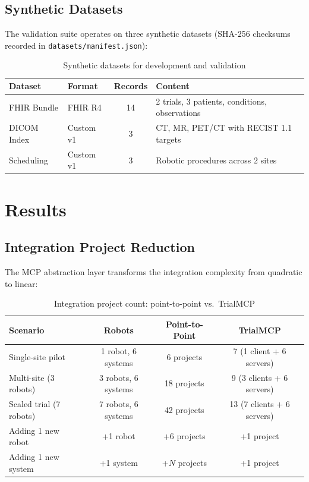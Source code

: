 \documentclass[10pt,letterpaper]{article}
\begin{document}
\subsection{Synthetic Datasets}

The validation suite operates on three synthetic datasets (SHA-256 checksums recorded in \texttt{datasets/manifest.json}):

\begin{table}[H]
\centering
\caption{Synthetic datasets for development and validation}
\label{tab:datasets}
\small
\begin{tabularx}{\textwidth}{l l c X}
\toprule
\textbf{Dataset} & \textbf{Format} & \textbf{Records} & \textbf{Content} \\
\midrule
FHIR Bundle & FHIR R4 & 14 & 2 trials, 3 patients, conditions, observations \\
DICOM Index & Custom v1 & 3 & CT, MR, PET/CT with RECIST 1.1 targets \\
Scheduling & Custom v1 & 3 & Robotic procedures across 2 sites \\
\bottomrule
\end{tabularx}
\end{table}

\section{Results}

\subsection{Integration Project Reduction}

The MCP abstraction layer transforms the integration complexity from quadratic to linear:

\begin{table}[H]
\centering
\caption{Integration project count: point-to-point vs.\ TrialMCP}
\label{tab:integration}
\small
\begin{tabularx}{\textwidth}{l c c c}
\toprule
\textbf{Scenario} & \textbf{Robots} & \textbf{Point-to-Point} & \textbf{TrialMCP} \\
\midrule
Single-site pilot & 1 robot, 6 systems & 6 projects & 7 (1 client + 6 servers) \\
Multi-site (3 robots) & 3 robots, 6 systems & 18 projects & 9 (3 clients + 6 servers) \\
Scaled trial (7 robots) & 7 robots, 6 systems & 42 projects & 13 (7 clients + 6 servers) \\
Adding 1 new robot & +1 robot & +6 projects & +1 project \\
Adding 1 new system & +1 system & +$N$ projects & +1 project \\
\bottomrule
\end{tabularx}
\end{table}
\end{document}

